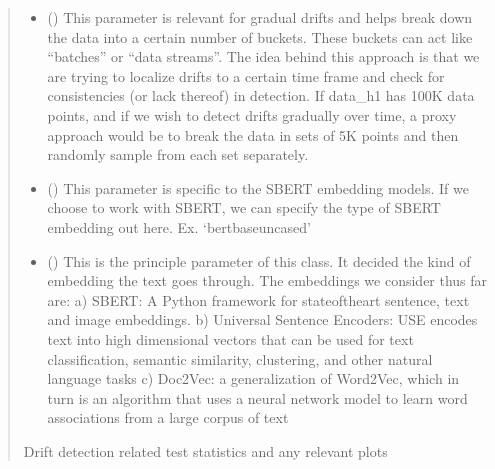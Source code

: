 \documentclass[letterpaper,10pt,english]{sphinxmanual}
\begin{document}
\begin{fulllineitems}
\begin{fulllineitems}
\begin{quote}
\begin{description}
\begin{itemize}
\item {} 
\sphinxAtStartPar
{} () \textendash{} This parameter is relevant for gradual drifts and helps break down the data into a
certain number of buckets. These buckets can act like “batches” or “data streams”.
The idea behind this approach is that we are trying to localize drifts to a certain
time frame and check for consistencies (or lack thereof) in detection.
If data\_h1 has 100K data points, and if we wish to detect drifts
gradually over time, a proxy approach would be to break the data in sets of 5K points
and then randomly sample from each set separately.

\item {} 
\sphinxAtStartPar
{} () \textendash{} This parameter is specific to the SBERT embedding models. If we choose to work with SBERT,
we can specify the type of SBERT embedding out here. Ex. ‘bert\sphinxhyphen{}base\sphinxhyphen{}uncased’

\item {} 
\sphinxAtStartPar
{} () \textendash{} This is the principle parameter of this class. It decided the kind of embedding the text
goes through. The embeddings we consider thus far are:
a) SBERT: A Python framework for state\sphinxhyphen{}of\sphinxhyphen{}the\sphinxhyphen{}art sentence, text and image embeddings.
b) Universal Sentence Encoders: USE encodes text into high dimensional vectors that can be
used for text classification, semantic similarity, clustering, and other natural language tasks
c) Doc2Vec: a generalization of Word2Vec, which in turn is an algorithm that uses a
neural network model to learn word associations from a large corpus of text

\end{itemize}

\sphinxAtStartPar
Drift detection related test statistics and any relevant plots

\end{description}\end{quote}

\end{fulllineitems}



\end{fulllineitems}
\end{document}
